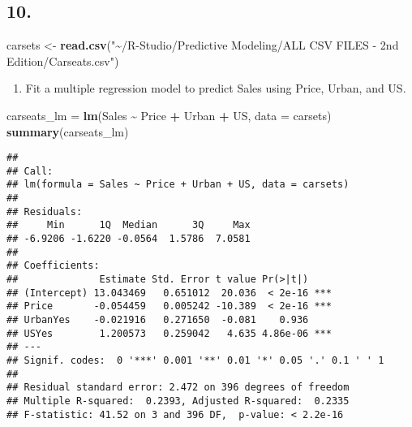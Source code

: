\documentclass[
]{article}
\newenvironment{Shaded}{\begin{snugshade}}{\end{snugshade}}
\newcommand{\AttributeTok}[1]{\textcolor[rgb]{0.13,0.29,0.53}{#1}}
\newcommand{\FunctionTok}[1]{\textcolor[rgb]{0.13,0.29,0.53}{\textbf{#1}}}
\newcommand{\NormalTok}[1]{#1}
\newcommand{\OtherTok}[1]{\textcolor[rgb]{0.56,0.35,0.01}{#1}}
\newcommand{\SpecialCharTok}[1]{\textcolor[rgb]{0.81,0.36,0.00}{\textbf{#1}}}
\newcommand{\StringTok}[1]{\textcolor[rgb]{0.31,0.60,0.02}{#1}}
\providecommand{\tightlist}{%
  \setlength{\itemsep}{0pt}\setlength{\parskip}{0pt}}
\begin{document}
\hypertarget{section}{%
\subsection{10.}\label{section}}

\begin{Shaded}
\begin{Highlighting}[]
\NormalTok{carsets }\OtherTok{\textless{}{-}} \FunctionTok{read.csv}\NormalTok{(}\StringTok{"\textasciitilde{}/R{-}Studio/Predictive Modeling/ALL CSV FILES {-} 2nd Edition/Carseats.csv"}\NormalTok{)}
\end{Highlighting}
\end{Shaded}

\begin{enumerate}
\def\labelenumi{(\alph{enumi})}
\tightlist
\item
  Fit a multiple regression model to predict Sales using Price, Urban,
  and US.
\end{enumerate}

\begin{Shaded}
\begin{Highlighting}[]
\NormalTok{carseats\_lm }\OtherTok{=} \FunctionTok{lm}\NormalTok{(Sales }\SpecialCharTok{\textasciitilde{}}\NormalTok{ Price }\SpecialCharTok{+}\NormalTok{ Urban }\SpecialCharTok{+}\NormalTok{ US, }\AttributeTok{data =}\NormalTok{ carsets)}
\FunctionTok{summary}\NormalTok{(carseats\_lm)}
\end{Highlighting}
\end{Shaded}

\begin{verbatim}
## 
## Call:
## lm(formula = Sales ~ Price + Urban + US, data = carsets)
## 
## Residuals:
##     Min      1Q  Median      3Q     Max 
## -6.9206 -1.6220 -0.0564  1.5786  7.0581 
## 
## Coefficients:
##              Estimate Std. Error t value Pr(>|t|)    
## (Intercept) 13.043469   0.651012  20.036  < 2e-16 ***
## Price       -0.054459   0.005242 -10.389  < 2e-16 ***
## UrbanYes    -0.021916   0.271650  -0.081    0.936    
## USYes        1.200573   0.259042   4.635 4.86e-06 ***
## ---
## Signif. codes:  0 '***' 0.001 '**' 0.01 '*' 0.05 '.' 0.1 ' ' 1
## 
## Residual standard error: 2.472 on 396 degrees of freedom
## Multiple R-squared:  0.2393, Adjusted R-squared:  0.2335 
## F-statistic: 41.52 on 3 and 396 DF,  p-value: < 2.2e-16
\end{verbatim}
\end{document}

